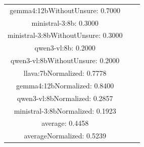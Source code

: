 \documentclass[a4paper]{article}
\begin{document}
\begin{tabular}{ccc}
gemma4:12bWithoutUnsure: 0.7000 \\ ministral-3:8b: 0.3000 \\ ministral-3:8bWithoutUnsure: 0.3000 \\ qwen3-vl:8b: 0.2000 \\ qwen3-vl:8bWithoutUnsure: 0.2000 \\ llava:7bNormalized: 0.7778 \\ gemma4:12bNormalized: 0.8400 \\ qwen3-vl:8bNormalized: 0.2857 \\ ministral-3:8bNormalized: 0.1923 \\ average: 0.4458 \\ averageNormalized: 0.5239 \end{minipage}\\
\end{tabular}

\vspace{5mm}
\end{document}
